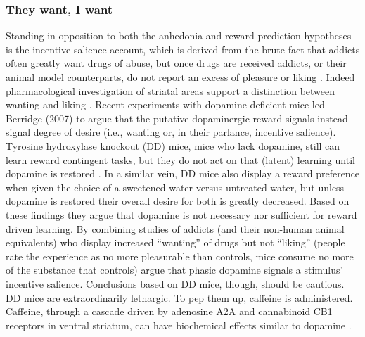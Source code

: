 \subsubsection{They want, I want}
\label{subsub:salience}
Standing in opposition to both the anhedonia and reward prediction hypotheses is the incentive salience account, which is derived from the brute fact that addicts often greatly want drugs of abuse, but once drugs are received addicts, or their animal model counterparts, do not report an excess of pleasure or liking \citep{Robinson:1993p8987}.  Indeed pharmacological investigation of striatal areas support a distinction between wanting and liking \citep{Berridge:2003p8998}.  Recent experiments with dopamine deficient mice led Berridge (2007) to argue that the putative dopaminergic reward signals instead signal degree of desire (i.e., wanting or, in their parlance, incentive salience).  Tyrosine hydroxylase knockout (DD) mice, mice who lack dopamine, still can learn reward contingent tasks, but they do not act on that (latent) learning until dopamine is restored \citep{Berridge:2007p7235}. In a similar vein, DD mice also display a reward preference when given the choice of a sweetened water versus untreated water, but unless dopamine is restored their overall desire for both is greatly decreased.  Based on these findings they argue that dopamine is not necessary nor sufficient for reward driven learning.  By combining studies of addicts (and their non-human animal equivalents) who display increased ``wanting'' of drugs but not ``liking'' (people rate the experience as no more pleasurable than controls, mice consume no more of the substance that controls) \citet{Berridge:2007p7235} argue that phasic dopamine signals a stimulus' incentive salience.  Conclusions based on DD mice, though, should be cautious.  DD mice are extraordinarily lethargic.  To pep them up, caffeine is administered.  Caffeine, through a cascade driven by adenosine A2A and cannabinoid CB1 receptors in ventral striatum, can have biochemical effects similar to dopamine \citep{Lazarus:2011p8137, Rossi:2010p7252}.

